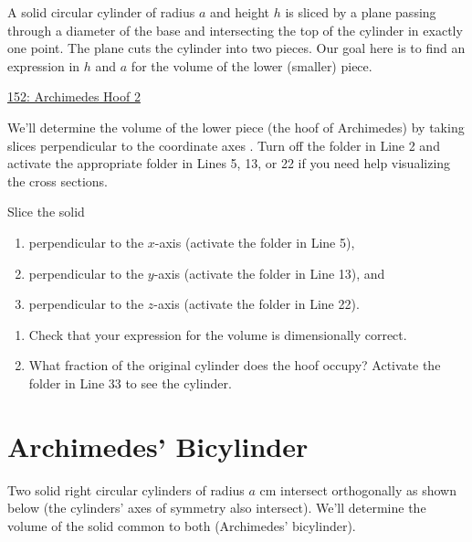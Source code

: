 \documentclass{ximera}
\begin{document}
\begin{question} \label{QKDFMReR}
A solid circular cylinder of radius $a$ and height $h$ is sliced by a plane passing through a diameter of the base and intersecting the top of the cylinder in exactly one point. The plane cuts the cylinder into two pieces. Our goal here is to find an expression in $h$ and $a$ for the volume of the lower (smaller) piece.

\begin{onlineOnly}
    \begin{center}
\end{center}
\end{onlineOnly}

\href{https://www.desmos.com/3d/cnspcoiggo}{152: Archimedes Hoof 2}

We'll determine the volume of the lower piece (the hoof of Archimedes) by taking slices perpendicular to the coordinate axes . Turn off the folder in Line 2 and activate the appropriate folder in Lines 5, 13, or 22 if you need help visualizing the cross sections.

Slice the solid 
\begin{enumerate}
\item perpendicular to the $x$-axis (activate the folder in Line 5),

\item perpendicular to the $y$-axis (activate the folder in Line 13), and

\item perpendicular to the $z$-axis (activate the folder in Line 22).
\end{enumerate} 

\begin{enumerate}
\item Check that your expression for the volume is dimensionally correct.

\item What fraction of the original cylinder does the hoof occupy? Activate the folder in Line 33 to see the cylinder.
\end{enumerate}


\end{question}

\section{Archimedes' Bicylinder}
Two solid right circular cylinders of radius $a$ cm intersect orthogonally as shown below (the cylinders' axes of symmetry also intersect). We'll determine the volume of the solid common to both (Archimedes' bicylinder).
\end{document}
